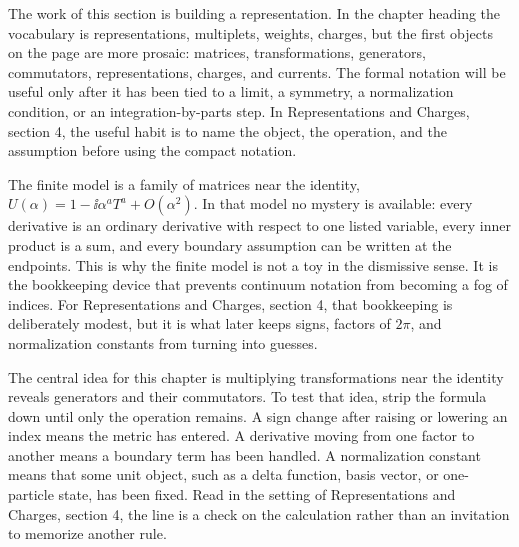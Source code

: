 











The work of this section is building a representation.  In the chapter heading the vocabulary is representations, multiplets, weights, charges, but the first objects on the page are more prosaic: matrices, transformations, generators, commutators, representations, charges, and currents.  The formal notation will be useful only after it has been tied to a limit, a symmetry, a normalization condition, or an integration-by-parts step.  In Representations and Charges, section 4, the useful habit is to name the object, the operation, and the assumption before using the compact notation.

The finite model is a family of matrices near the identity, \(U(\alpha)=1-\ii\alpha^aT^a+O(\alpha^2)\).  In that model no mystery is available: every derivative is an ordinary derivative with respect to one listed variable, every inner product is a sum, and every boundary assumption can be written at the endpoints.  This is why the finite model is not a toy in the dismissive sense.  It is the bookkeeping device that prevents continuum notation from becoming a fog of indices.  For Representations and Charges, section 4, that bookkeeping is deliberately modest, but it is what later keeps signs, factors of \(2\pi\), and normalization constants from turning into guesses.

The central idea for this chapter is multiplying transformations near the identity reveals generators and their commutators.  To test that idea, strip the formula down until only the operation remains.  A sign change after raising or lowering an index means the metric has entered.  A derivative moving from one factor to another means a boundary term has been handled.  A normalization constant means that some unit object, such as a delta function, basis vector, or one-particle state, has been fixed.  Read in the setting of Representations and Charges, section 4, the line is a check on the calculation rather than an invitation to memorize another rule.

